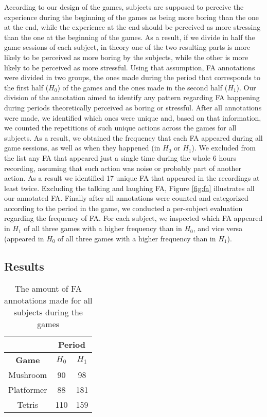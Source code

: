 According to our design of the games, subjects are supposed to perceive the experience during the beginning of the games as being more boring than the one at the end, while the experience at the end should be perceived as more stressing than the one at the beginning of the games. As a result, if we divide in half the game sessions of each subject, in theory one of the two resulting parts is more likely to be perceived as more boring by the subjects, while the other is more likely to be perceived as more stressful. Using that assumption, FA annotations were divided in two groups, the ones made during the period that corresponds to the first half ($H_0$) of the games and the ones made in the second half ($H_1$). Our division of the annotation aimed to identify any pattern regarding FA happening during periods theoretically perceived as boring or stressful. After all annotations were made, we identified which ones were unique and, based on that information, we counted the repetitions of such unique actions across the games for all subjects. As a result, we obtained the frequency that each FA appeared during all game sessions, as well as when they happened (in $H_0$ or $H_1$). We excluded from the list any FA that appeared just a single time during the whole 6 hours recording, assuming that such action was noise or probably part of another action. As a result we identified 17 unique FA that appeared in the recordings at least twice. Excluding the talking and laughing FA, Figure \ref{fig:fa} illustrates all our annotated FA. Finally after all annotations were counted and categorized according to the period in the game, we conducted a per-subject evaluation regarding the frequency of FA. For each subject, we inspected which FA appeared in $H_1$ of all three games with a higher frequency than in $H_0$, and vice versa (appeared in $H_0$ of all three games with a higher frequency than in $H_1$).

\subsection{Results}

\begin{table}[!h]
\renewcommand{\arraystretch}{1.3}
\caption{The amount of FA annotations made for all subjects during the games}
\label{table:amount-fa}
\centering
\begin{tabular}{|c|c|c|}
\cline{2-3}
\multicolumn{1}{c|}{} & \multicolumn{2}{|c|}{\textbf{Period}} \\
\hline
\textbf{Game} & $H_0$ & $H_1$ \\
\hline
Mushroom   & 90 & 98 \\
\hline
Platformer & 88 & 181 \\
\hline
Tetris     & 110 & 159 \\
\hline
\end{tabular}
\end{table}


